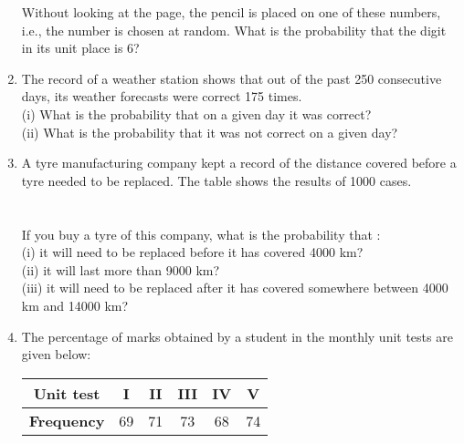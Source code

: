 \documentclass[journal,12pt,twocolumn]{IEEEtran}
\begin{document}
\begin{enumerate}[label=\arabic*]
Without looking at the page, the pencil is placed on one of these numbers, i.e., the number is chosen at random. What is the probability that the digit in its unit place is 6?\\
   \item The record of a weather station shows that out of the past 250 consecutive days, its weather forecasts were correct 175 times.\\
   (i) What is the probability that on a given day it was correct?\\
(ii) What is the probability that it was not correct on a given day?\\
\item A tyre manufacturing company kept a record of the distance covered
before a tyre needed to be replaced. The table shows the results of 1000 cases.\\
\\
\\

If you buy a tyre of this company, what is the probability that :\\
(i) it will need to be replaced before it has covered 4000 km?\\
(ii) it will last more than 9000 km?\\
(iii) it will need to be replaced after it has covered somewhere between 4000 km and 14000 km?\\
\item The percentage of marks obtained by a student in the monthly unit tests are given below:\\

\begin{tabular}{ |c|c|c|c|c|c| } 
 \hline
 \textbf{Unit test} &I &II &III &IV &V \\ 
 \hline
 \textbf{Frequency }&69 &71 &73 &68 &74\\ 
 \hline
\end{tabular}\\


\end{enumerate}
\end{document}
